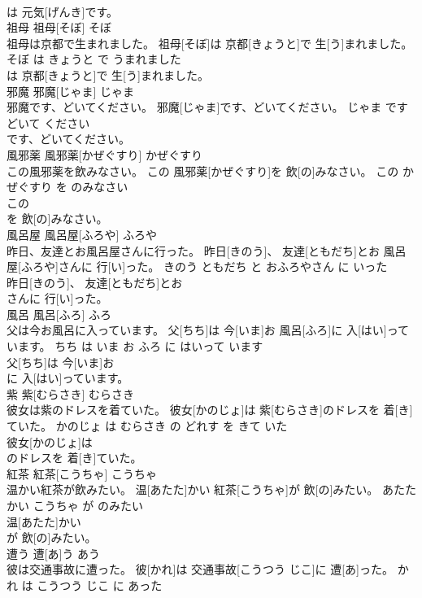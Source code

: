 \documentclass[8pt]{extreport}
\begin{document}
\begin{CJK}{UTF8}{min}
\\	は 元気[げんき]です。			
\\	祖母	祖母[そぼ]	そぼ	
\\	祖母は京都で生まれました。	祖母[そぼ]は 京都[きょうと]で 生[う]まれました。	そぼ は きょうと で うまれました	
\\	は 京都[きょうと]で 生[う]まれました。			
\\	邪魔	邪魔[じゃま]	じゃま	
\\	邪魔です、どいてください。	邪魔[じゃま]です、どいてください。	じゃま です どいて ください	
\\	です、どいてください。			
\\	風邪薬	風邪薬[かぜぐすり]	かぜぐすり	
\\	この風邪薬を飲みなさい。	この 風邪薬[かぜぐすり]を 飲[の]みなさい。	この かぜぐすり を のみなさい	
\\	この
\\	を 飲[の]みなさい。			
\\	風呂屋	風呂屋[ふろや]	ふろや	
\\	昨日、友達とお風呂屋さんに行った。	昨日[きのう]、 友達[ともだち]とお 風呂屋[ふろや]さんに 行[い]った。	きのう ともだち と おふろやさん に いった	
\\	昨日[きのう]、 友達[ともだち]とお
\\	さんに 行[い]った。			
\\	風呂	風呂[ふろ]	ふろ	
\\	父は今お風呂に入っています。	父[ちち]は 今[いま]お 風呂[ふろ]に 入[はい]っています。	ちち は いま お ふろ に はいって います	
\\	父[ちち]は 今[いま]お
\\	に 入[はい]っています。			
\\	紫	紫[むらさき]	むらさき	
\\	彼女は紫のドレスを着ていた。	彼女[かのじょ]は 紫[むらさき]のドレスを 着[き]ていた。	かのじょ は むらさき の どれす を きて いた	
\\	彼女[かのじょ]は
\\	のドレスを 着[き]ていた。			
\\	紅茶	紅茶[こうちゃ]	こうちゃ	
\\	温かい紅茶が飲みたい。	温[あたた]かい 紅茶[こうちゃ]が 飲[の]みたい。	あたたかい こうちゃ が のみたい	
\\	温[あたた]かい
\\	が 飲[の]みたい。			
\\	遭う	遭[あ]う	あう	
\\	彼は交通事故に遭った。	彼[かれ]は 交通事故[こうつう じこ]に 遭[あ]った。	かれ は こうつう じこ に あった	

\end{CJK}
\end{document}
